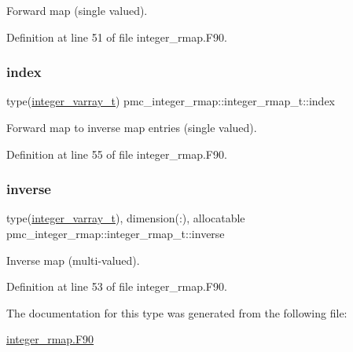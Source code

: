 Forward map (single valued). 



Definition at line 51 of file integer\+\_\+rmap.\+F90.

\mbox{\label{structpmc__integer__rmap_1_1integer__rmap__t_a49514d00b7b652b8e4ab83e448259bb7}} 
\subsubsection{\texorpdfstring{index}{index}}
{\footnotesize\ttfamily type(\mbox{\hyperlink{structpmc__integer__varray_1_1integer__varray__t}{integer\+\_\+varray\+\_\+t}}) pmc\+\_\+integer\+\_\+rmap\+::integer\+\_\+rmap\+\_\+t\+::index}



Forward map to inverse map entries (single valued). 



Definition at line 55 of file integer\+\_\+rmap.\+F90.

\mbox{\label{structpmc__integer__rmap_1_1integer__rmap__t_ad3d3ed1f13dda7d95d31dc9b20011288}} 
\subsubsection{\texorpdfstring{inverse}{inverse}}
{\footnotesize\ttfamily type(\mbox{\hyperlink{structpmc__integer__varray_1_1integer__varray__t}{integer\+\_\+varray\+\_\+t}}), dimension(\+:), allocatable pmc\+\_\+integer\+\_\+rmap\+::integer\+\_\+rmap\+\_\+t\+::inverse}



Inverse map (multi-\/valued). 



Definition at line 53 of file integer\+\_\+rmap.\+F90.



The documentation for this type was generated from the following file\+:\begin{DoxyCompactItemize}
\item 
\mbox{\hyperlink{integer__rmap_8_f90}{integer\+\_\+rmap.\+F90}}\end{DoxyCompactItemize}
